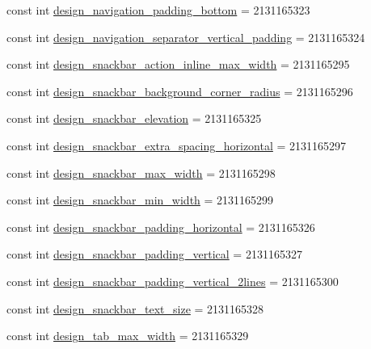 \begin{CompactItemize}
\item 
const int \hyperlink{class__2doo_1_1_droid_1_1_resource_1_1_dimension_7ee05015c080b4101dfdc2e62f1f8724}{design\_\-navigation\_\-padding\_\-bottom} = 2131165323
\item 
const int \hyperlink{class__2doo_1_1_droid_1_1_resource_1_1_dimension_5c99b9a570164fbffe4af75d7b138aeb}{design\_\-navigation\_\-separator\_\-vertical\_\-padding} = 2131165324
\item 
const int \hyperlink{class__2doo_1_1_droid_1_1_resource_1_1_dimension_a76db3bdd37ebd0de70653ae038e2708}{design\_\-snackbar\_\-action\_\-inline\_\-max\_\-width} = 2131165295
\item 
const int \hyperlink{class__2doo_1_1_droid_1_1_resource_1_1_dimension_4efd9e473f1291b2587ca5d10e990403}{design\_\-snackbar\_\-background\_\-corner\_\-radius} = 2131165296
\item 
const int \hyperlink{class__2doo_1_1_droid_1_1_resource_1_1_dimension_b5654b8d363632c8d20dfc5af505333c}{design\_\-snackbar\_\-elevation} = 2131165325
\item 
const int \hyperlink{class__2doo_1_1_droid_1_1_resource_1_1_dimension_17cabf54bbede8fae69ce16f6b769ab3}{design\_\-snackbar\_\-extra\_\-spacing\_\-horizontal} = 2131165297
\item 
const int \hyperlink{class__2doo_1_1_droid_1_1_resource_1_1_dimension_91c5e2c2cc7d7ceb08d9f47031d2660e}{design\_\-snackbar\_\-max\_\-width} = 2131165298
\item 
const int \hyperlink{class__2doo_1_1_droid_1_1_resource_1_1_dimension_7d6b60001a31f68da49dd282c7fa2786}{design\_\-snackbar\_\-min\_\-width} = 2131165299
\item 
const int \hyperlink{class__2doo_1_1_droid_1_1_resource_1_1_dimension_474644c6f6e812631528980f4a777a61}{design\_\-snackbar\_\-padding\_\-horizontal} = 2131165326
\item 
const int \hyperlink{class__2doo_1_1_droid_1_1_resource_1_1_dimension_af50c94f05ff9da2f5a99ba8b1928764}{design\_\-snackbar\_\-padding\_\-vertical} = 2131165327
\item 
const int \hyperlink{class__2doo_1_1_droid_1_1_resource_1_1_dimension_304281ec7f9bfcaba2b7225b26de6225}{design\_\-snackbar\_\-padding\_\-vertical\_\-2lines} = 2131165300
\item 
const int \hyperlink{class__2doo_1_1_droid_1_1_resource_1_1_dimension_5abbbf5ed1ae3e3e84a7b34a64fc5ce3}{design\_\-snackbar\_\-text\_\-size} = 2131165328
\item 
const int \hyperlink{class__2doo_1_1_droid_1_1_resource_1_1_dimension_4fbb317fc5d589d9694abff275693793}{design\_\-tab\_\-max\_\-width} = 2131165329

\end{CompactItemize}
